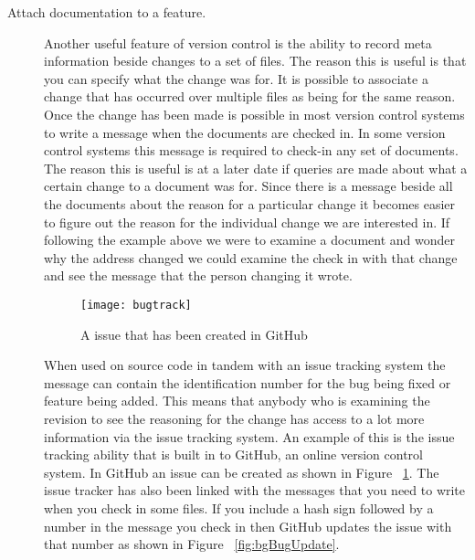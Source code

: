 \begin{description}

  \item [Attach documentation to a feature.]
  Another useful feature of version control is the ability to record meta information beside changes to a set of files.  The reason this is useful is that you can specify what the change was for.  It is possible to associate a change that has occurred over multiple files as being for the same reason.  Once the change has been made is possible in most version control systems to write a message when the documents are checked in.  In some version control systems this message is required to check-in any set of documents.  The reason this is useful is at a later date if queries are made about what a certain change to a document was for.  Since there is a message beside all the documents about the reason for a particular change it becomes easier to figure out the reason for the individual change we are interested in. If following the example above we were to examine a document and wonder why the address changed we could examine the check in with that change and see the message that the person changing it wrote.

  \begin{figure}[!T]
   \begin{center}
    \texttt{[image: bugtrack]}
   \end{center}
   \caption{A issue that has been created in GitHub}
   \label{fig:bgBugTrack}
  \end{figure}

  When used on source code in tandem with an issue tracking system the message can contain the identification number for the bug being fixed or feature being added.  This means that anybody who is examining the revision to see the reasoning for the change has access to a lot more information via the issue tracking system. An example of this is the issue tracking ability that is built in to GitHub, an online version control system. In GitHub an issue can be created as shown in Figure ~\ref{fig:bgBugTrack}. The issue tracker has also been linked with the messages that you need to write when you check in some files. If you include a hash sign followed by a number in the message you check in then GitHub updates the issue with that number as shown in Figure ~\ref{fig:bgBugUpdate}.


\end{description}
